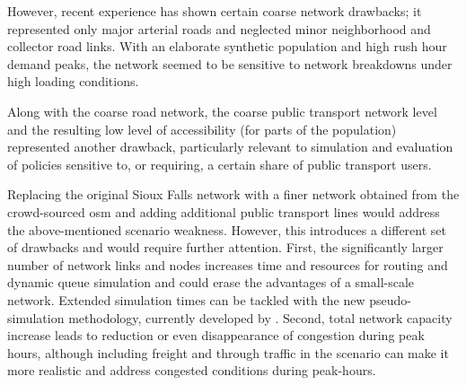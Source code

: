 However, recent experience has shown certain coarse network drawbacks; it represented only major arterial roads and neglected minor neighborhood and collector road links. With an elaborate synthetic population and high rush hour demand peaks, the network seemed to be sensitive to network breakdowns under high loading conditions. 

Along with the coarse road network, the coarse public transport network level and the resulting  low level of accessibility (for parts of the population) represented another drawback, particularly relevant to simulation and evaluation of policies sensitive to, or requiring, a certain share of public transport users. 

Replacing the original Sioux Falls network with a finer network obtained from the crowd-sourced \gls{osm} and adding additional public transport lines would address the above-mentioned scenario weakness. However, this introduces a different set of drawbacks and would require further attention. First, the significantly larger number of network links and nodes increases time and resources for routing and dynamic queue simulation and could erase the advantages of a small-scale network. Extended simulation times can be tackled with the new pseudo-simulation methodology, currently developed by \citet[][]{FourieEtAl_TRR_2013}.
Second, total network capacity increase leads to reduction or even disappearance of congestion during peak hours, although including freight and through traffic in the scenario can make it more realistic and address congested conditions during peak-hours. 

